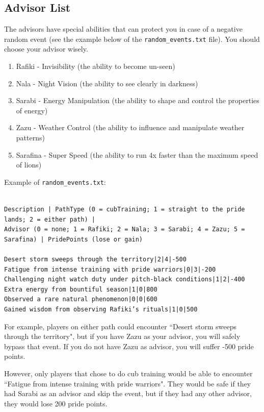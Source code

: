 \subsection{Advisor List}
The advisors have special abilities that can protect you in case of a negative random event (see the example below of the \verb|random_events.txt| file). You should choose your advisor wisely.
\begin{enumerate}

\item Rafiki - Invisibility (the ability to become un-seen)
\item Nala - Night Vision (the ability to see clearly in darkness)
\item Sarabi - Energy Manipulation (the ability to shape and control the properties of energy)
\item Zazu - Weather Control (the ability to influence and manipulate weather patterns)
\item Sarafina - Super Speed (the ability to run 4x faster than the maximum speed of lions)



\end{enumerate}


Example of \verb|random_events.txt|:
\begin{verbatim}

Description | PathType (0 = cubTraining; 1 = straight to the pride lands; 2 = either path) | 
Advisor (0 = none; 1 = Rafiki; 2 = Nala; 3 = Sarabi; 4 = Zazu; 5 = Sarafina) | PridePoints (lose or gain)

Desert storm sweeps through the territory|2|4|-500
Fatigue from intense training with pride warriors|0|3|-200
Challenging night watch duty under pitch-black conditions|1|2|-400
Extra energy from bountiful season|1|0|800
Observed a rare natural phenomenon|0|0|600
Gained wisdom from observing Rafiki’s rituals|1|0|500

\end{verbatim}

For example, players on either path could encounter ``Desert storm sweeps through the territory", but if you have Zazu as your advisor, you will safely bypass that event. If you do not have Zazu as advisor, you will suffer -500 pride points. 

However, only players that chose to do cub training would be able to encounter ``Fatigue from intense training with pride warriors". They would be safe if they had Sarabi as an advisor and skip the event, but if they had any other advisor, they would lose 200 pride points.

